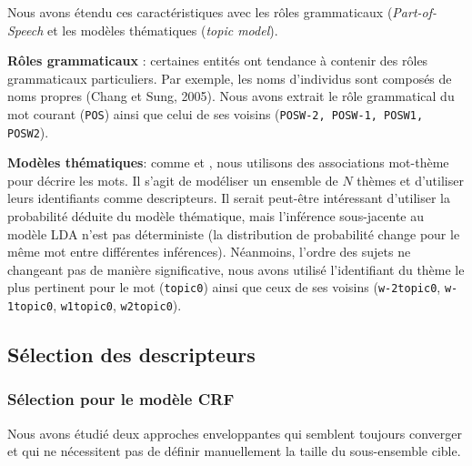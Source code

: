 Nous avons étendu ces caractéristiques avec les rôles grammaticaux (\textit{Part-of-Speech} et les modèles thématiques (\textit{topic model}).

\textbf{Rôles grammaticaux} : certaines entités ont tendance à contenir des rôles grammaticaux particuliers. Par exemple, les noms d'individus sont composés de noms propres (Chang et Sung, 2005). Nous avons extrait le rôle grammatical du mot courant (\verb|POS|) ainsi que celui de ses voisins (\texttt{POSW-2, POSW-1, POSW1, POSW2}).

\textbf{Modèles thématiques}: comme \citet{polifroni2011usingLDA} et \citet{nallapati2010blinddomaintransferner}, nous utilisons des associations mot-thème pour décrire les mots. Il s'agit de modéliser un ensemble de $N$ thèmes et d'utiliser leurs identifiants comme descripteurs. Il serait peut-être intéressant d'utiliser la probabilité déduite du modèle thématique, mais l'inférence sous-jacente au modèle LDA \citep{blei2003lda} n'est pas déterministe (la distribution de probabilité change pour le même mot entre différentes inférences).
Néanmoins, l'ordre des sujets ne changeant pas de manière significative, nous avons utilisé l'identifiant du thème le plus pertinent pour le mot (\verb|topic0|) ainsi que ceux de ses voisins (\verb|w-2topic0|, \verb|w-1topic0|, \verb|w1topic0|, \verb|w2topic0|).

\subsection{Sélection des descripteurs}
\subsubsection{Sélection  pour le modèle CRF}
 Nous avons étudié deux approches enveloppantes qui semblent toujours converger et qui ne nécessitent pas de définir manuellement la taille du sous-ensemble cible. %

